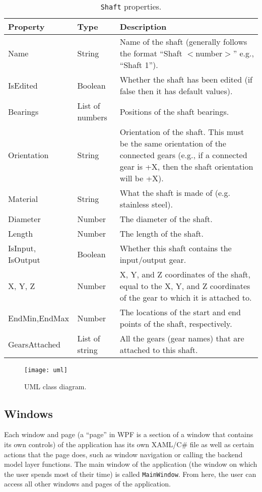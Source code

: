 \begin{doublespace}
\begin{table}[htbp]
    \centering
    \caption{\texttt{Shaft} properties.}
    \label{tab:shaft}
    \begin{tabularx}{1\textwidth}{||Y|Y|Y||}
    \hline Property & Type & Description \\ \hline \hline
        Name & String & Name of the shaft (generally follows the format ``Shaft $<$number$>$'' e.g., ``Shaft 1''). \\ \hline
        IsEdited & Boolean & Whether the shaft has been edited (if false then it has default values). \\ \hline
        Bearings & List of numbers & Positions of the shaft bearings. \\ \hline
        Orientation & String & Orientation of the shaft. This must be the same orientation of the connected gears (e.g., if a connected gear is +X, then the shaft orientation will be +X). \\ \hline
        Material & String & What the shaft is made of (e.g. stainless steel). \\ \hline
        Diameter & Number & The diameter of the shaft. \\ \hline
        Length & Number & The length of the shaft. \\ \hline
        IsInput, IsOutput & Boolean & Whether this shaft contains the input/output gear. \\ \hline
        X, Y, Z & Number & X, Y, and Z coordinates of the shaft, equal to the X, Y, and Z coordinates of the gear to which it is attached to. \\ \hline
        EndMin,EndMax & Number & The locations of the start and end points of the shaft, respectively. \\ \hline
        GearsAttached & List of string & All the gears (gear names) that are attached to this shaft. \\ \hline
    \end{tabularx}
\end{table}

\begin{figure}[htbp]
    \texttt{[image: uml]}
    \caption{UML class diagram.}
    \label{fig:uml}
\end{figure}

\subsection{Windows}
Each window and page (a ``page'' in WPF is a section of a window that contains its own controls) of the application has its own XAML/C\# file as well as certain actions that the page does, such as window navigation or calling the backend model layer functions. The main window of the application (the window on which the user spends most of their time) is called \texttt{MainWindow}. From here, the user can access all other windows and pages of the application.


\end{doublespace}
